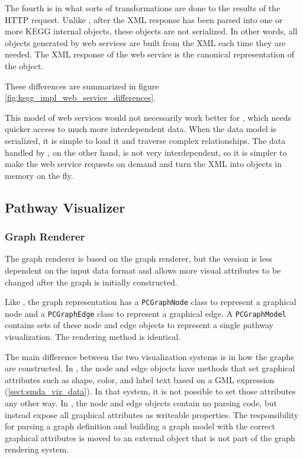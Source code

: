 The fourth is in what sorts of transformations are done to the results of the
HTTP request. Unlike \mawapp, after the XML response has been parsed into
one or more KEGG internal objects, these objects are not serialized. In other
words, all objects generated by web services are built from the XML each time
they are needed. The XML response of the web service is the canonical
representation of the object.

These differences are summarized in figure
\ref{fig:kegg_impl_web_service_differences}.

This model of web services would not necessarily work better for \mawapp,
which needs quicker access to much more interdependent data. When the data model
is serialized, it is simple to load it and traverse complex relationships. The
data handled by \keggapp, on the other hand, is not very interdependent, so
it is simpler to make the web service requests on demand and turn the XML into
objects in memory on the fly.

\subsection{Pathway Visualizer}
\label{sect:kegg_impl_graph_view}

\subsubsection{Graph Renderer}

The \keggapp graph renderer is based on the \mawapp graph renderer, but the
\keggapp version is less dependent on the input data format and allows more
visual attributes to be changed after the graph is initially constructed.

Like \mawapp, the \keggapp graph representation has a \texttt{PCGraphNode} class
to represent a graphical node and a \texttt{PCGraphEdge} class to represent a
graphical edge. A \texttt{PCGraphModel} contains sets of these node and edge
objects to represent a single pathway visualization. The rendering method is
identical.

The main difference between the two visualization systems is in how the graphs
are constructed. In \mawapp, the node and edge objects have methods that set
graphical attributes such as shape, color, and label text based on a GML
expression (\ref{sect:smda_viz_data}). In that system, it is not possible to set
those attributes any other way. In \keggapp, the node and edge objects contain
no parsing code, but instead expose all graphical attributes as writeable
properties. The responsibility for parsing a graph definition and building a
graph model with the correct graphical attributes is moved to an external object
that is not part of the graph rendering system.

